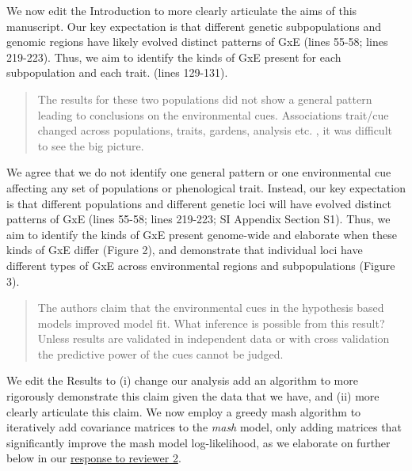 \documentclass[
  letterpaper,
  DIV=11,
  numbers=noendperiod]{scrartcl}
\begin{document}
We now edit the Introduction to more clearly articulate the aims of this
manuscript. Our key expectation is that different genetic subpopulations
and genomic regions have likely evolved distinct patterns of GxE (lines
55-58; lines 219-223). Thus, we aim to identify the kinds of GxE present
for each subpopulation and each trait. (lines 129-131).

\begin{quote}
\begin{tcolorbox}[enhanced jigsaw, colframe=quarto-callout-warning-color-frame, rightrule=.15mm, leftrule=.75mm, left=2mm, breakable, toprule=.15mm, arc=.35mm, bottomrule=.15mm, opacityback=0, colback=white]

The results for these two populations did not show a general pattern
leading to conclusions on the environmental cues. Associations trait/cue
changed across populations, traits, gardens, analysis etc. , it was
difficult to see the big picture.

\end{tcolorbox}
\end{quote}

We agree that we do not identify one general pattern or one
environmental cue affecting any set of populations or phenological
trait. Instead, our key expectation is that different populations and
different genetic loci will have evolved distinct patterns of GxE (lines
55-58; lines 219-223; SI Appendix Section S1). Thus, we aim to identify
the kinds of GxE present genome-wide and elaborate when these kinds of
GxE differ (Figure 2), and demonstrate that individual loci have
different types of GxE across environmental regions and subpopulations
(Figure 3).

\begin{quote}
\begin{tcolorbox}[enhanced jigsaw, colframe=quarto-callout-warning-color-frame, rightrule=.15mm, leftrule=.75mm, left=2mm, breakable, toprule=.15mm, arc=.35mm, bottomrule=.15mm, opacityback=0, colback=white]

The authors claim that the environmental cues in the hypothesis based
models improved model fit. What inference is possible from this result?
Unless results are validated in independent data or with cross
validation the predictive power of the cues cannot be judged.

\end{tcolorbox}
\end{quote}

We edit the Results to (i) change our analysis add an algorithm to more
rigorously demonstrate this claim given the data that we have, and (ii)
more clearly articulate this claim. We now employ a greedy mash
algorithm to iteratively add covariance matrices to the \emph{mash}
model, only adding matrices that significantly improve the mash model
log-likelihood, as we elaborate on further below in our
\hyperref[fig-greedy]{response to reviewer 2}.
\end{document}
